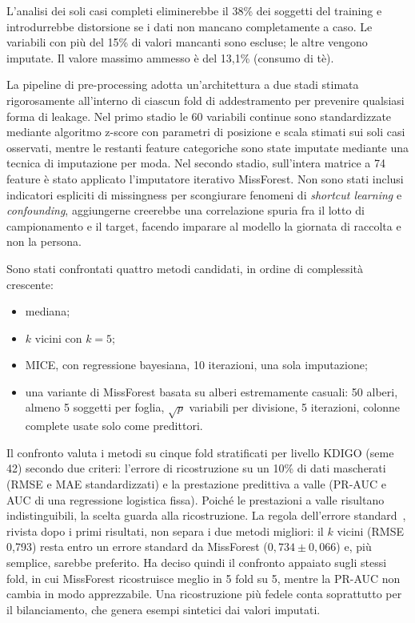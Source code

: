 \documentclass[a4paper, 12pt, oneside]{book}
\begin{document}
L'analisi dei soli casi completi eliminerebbe il 38\% dei soggetti del training e introdurrebbe distorsione se i dati non mancano completamente a caso. Le variabili con più del 15\% di valori mancanti sono escluse; le altre vengono imputate. Il valore massimo ammesso è del 13,1\% (consumo di tè).

La pipeline di pre-processing adotta un'architettura a due stadi stimata rigorosamente all'interno di ciascun fold di addestramento per prevenire qualsiasi forma di leakage. Nel primo stadio le 60 variabili continue sono standardizzate mediante algoritmo z-score con parametri di posizione e scala stimati sui soli casi osservati, mentre le restanti feature categoriche sono state imputate mediante una tecnica di imputazione per moda. Nel secondo stadio, sull'intera matrice a 74 feature è stato applicato l'imputatore iterativo MissForest. Non sono stati inclusi indicatori espliciti di missingness per scongiurare fenomeni di \textit{shortcut learning} e \textit{confounding}, aggiungerne creerebbe una correlazione spuria fra il lotto di campionamento e il target, facendo imparare al modello la giornata di raccolta e non la persona.

Sono stati confrontati quattro metodi candidati, in ordine di complessità crescente:
\begin{itemize}
	\item mediana;
	\item $k$ vicini con $k = 5$;
	\item MICE, con regressione bayesiana, 10 iterazioni, una sola imputazione;
	\item una variante di MissForest basata su alberi estremamente casuali: 50 alberi, almeno 5 soggetti per foglia, $\sqrt{p}$ variabili per divisione, 5 iterazioni, colonne complete usate solo come predittori.
\end{itemize}

Il confronto valuta i metodi su cinque fold stratificati per livello KDIGO (seme 42) secondo due criteri: l'errore di ricostruzione su un 10\% di dati mascherati (RMSE e MAE standardizzati) e la prestazione predittiva a valle (PR-AUC e AUC di una regressione logistica fissa). Poiché le prestazioni a valle risultano indistinguibili, la scelta guarda alla ricostruzione. La regola dell'errore standard~\cite{hastie_elements_2009}, rivista dopo i primi risultati, non separa i due metodi migliori: il $k$ vicini (RMSE 0,793) resta entro un errore standard da MissForest ($0{,}734 \pm 0{,}066$) e, più semplice, sarebbe preferito. Ha deciso quindi il confronto appaiato sugli stessi fold, in cui MissForest ricostruisce meglio in 5 fold su 5, mentre la PR-AUC non cambia in modo apprezzabile. Una ricostruzione più fedele conta soprattutto per il bilanciamento, che genera esempi sintetici dai valori imputati.
\end{document}
